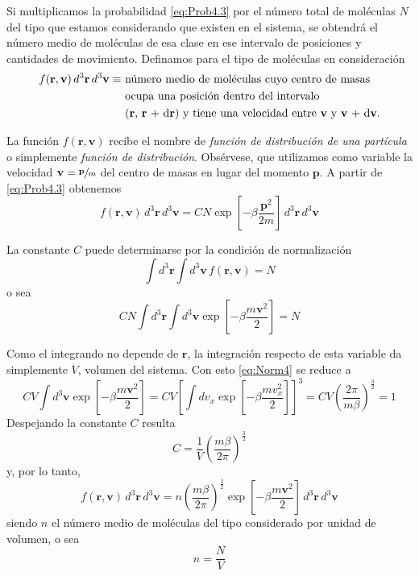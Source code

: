 Si multiplicamos la probabilidad \eqref{eq:Prob4.3} por el número total de moléculas $N$ del tipo que estamos considerando que existen en el sistema, se obtendrá el número medio de moléculas de esa clase en ese intervalo de posiciones y cantidades de movimiento.
Definamos para el tipo de moléculas en consideración
\begin{align}
	f(\mathbf{r}, \mathbf{v}) \, d^3 \mathbf{r} \, d^3 \mathbf{v} \equiv & \text{ número medio de moléculas cuyo centro de masas} \nonumber \\
				& \text{ ocupa una posición dentro del intervalo}  \\
				& \text{ (\textbf{r}, \textbf{r} + d\textbf{r}) y tiene una velocidad entre \textbf{v} y \textbf{v} + d\textbf{v}}. \nonumber
\end{align}

La función $f(\mathbf{r}, \mathbf{v})$ recibe el nombre de \emph{función de distribución de una partícula} o
simplemente \emph{función de distribución}.
Obsérvese, que utilizamos como variable la velocidad $\mathbf{v} = \sfrac{\mathbf{p}}{m}$ del centro de masas en lugar del momento $\mathbf{p}$.
A partir de \eqref{eq:Prob4.3} obtenemos
\begin{equation}
f(\mathbf{r}, \mathbf{v}) \, d^3 \mathbf{r} \, d^3 \mathbf{v} = C N \exp \left[ -\beta\frac{\mathbf{p}^2}{2m} \right] \, d^3 \mathbf{r} \, d^3 \mathbf{v}
\end{equation}

La constante $C$ puede determinarse por la condición de normalización
\begin{equation}
\int d^3 \mathbf{r} \int d^3 \mathbf{v} \, f(\mathbf{r}, \mathbf{v}) = N
\end{equation}
o sea
\begin{equation}
	C N \int d^3 \mathbf{r} \int d^3 \mathbf{v} \exp \left[ -\beta\frac{m\mathbf{v}^2}{2} \right] = N \label{eq:Norm4}
\end{equation}

Como el integrando no depende de $\mathbf{r}$, la integración respecto de esta variable da simplemente $V$, volumen del sistema.
Con esto \eqref{eq:Norm4} se reduce a 
\begin{equation}
	C V \int d^3 \mathbf{v} \exp \left[ -\beta\frac{m\mathbf{v}^2}{2} \right] = C V \left[ \int dv_x \exp \left[ -\beta\frac{mv_x^2}{2} \right]\right]^3 = CV \left( \frac{2\pi}{m\beta} \right) ^{\frac{3}{2}} = 1
\end{equation}
Despejando la constante $C$ resulta
\begin{equation}
	C = \frac{1}{V} \left( \frac{m\beta}{2\pi} \right) ^{\frac{3}{2}}
\end{equation}
y, por lo tanto,
\begin{equation}\label{eq:f_def}
	f(\mathbf{r}, \mathbf{v}) \, d^3 \mathbf{r} \, d^3 \mathbf{v} = n \left( \frac{m\beta}{2\pi} \right) ^{\frac{3}{2}} \exp \left[ -\beta\frac{m\mathbf{v}^2}{2} \right] \, d^3 \mathbf{r} \, d^3 \mathbf{v}
\end{equation}
siendo $n$ el número medio de moléculas del tipo considerado por unidad de volumen, o sea
$$n = \frac{N}{V}$$

